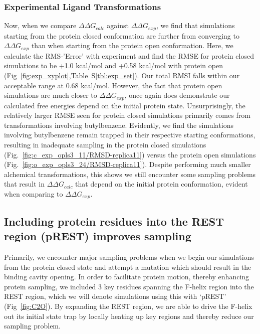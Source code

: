 \documentclass[journal=jctcce,manuscript=article]{achemso}
\begin{document}
\subsubsection*{Experimental Ligand Transformations}
Now, when we compare $\Delta\Delta G_{calc}$ against $\Delta\Delta G_{exp}$, we find that simulations starting from the protein closed conformation are further from converging to $\Delta\Delta G_{exp}$ than when starting from the protein open conformation. 
Here, we calculate the RMS-'Error' with experiment and find the RMSE for protein closed simulations to be +1.0 kcal/mol and +0.58 kcal/mol with protein open (Fig~\ref{fig:exp_xyplot},Table~S\ref{tbl:exp_set}).
Our total RMSI falls within our acceptable range at 0.68 kcal/mol.
However, the fact that protein open simulations are much closer to $\Delta\Delta G_{exp}$, once again does demonstrate our calculated free energies depend on the initial protein state.
Unsurprisingly, the relatively larger RMSE seen for protein closed simulations primarily comes from transformations involving butylbenzene.
Evidently, we find the simulations involving butylbenzene remain trapped in their respective starting conformations, resulting in inadequate sampling in the protein closed simulations (Fig.~\ref{fig:c_exp_opls3_11/RMSD-replica11}) versus the protein open simulations (Fig.~\ref{fig:o_exp_opls3_24/RMSD-replica11}).
Despite performing much smaller alchemical transformations, this shows we still encounter some sampling problems that result in $\Delta\Delta G_{calc}$ that depend on the initial protein conformation, evident when comparing to $\Delta\Delta G_{exp}$.

\subsection*{Including protein residues into the REST region (pREST) improves sampling}
Primarily, we encounter major sampling problems when we begin our simulations from the protein closed state and attempt a mutation which should result in the binding cavity opening.
In order to facilitate protein motion, thereby enhancing protein sampling, we included 3 key residues spanning the F-helix region into the REST region, which we will denote simulations using this with `pREST' (Fig~\ref{fig:C2O}).
By expanding the REST region, we are able to drive the F-helix out its initial state trap by locally heating up key regions and thereby reduce our sampling problem.
\end{document}
